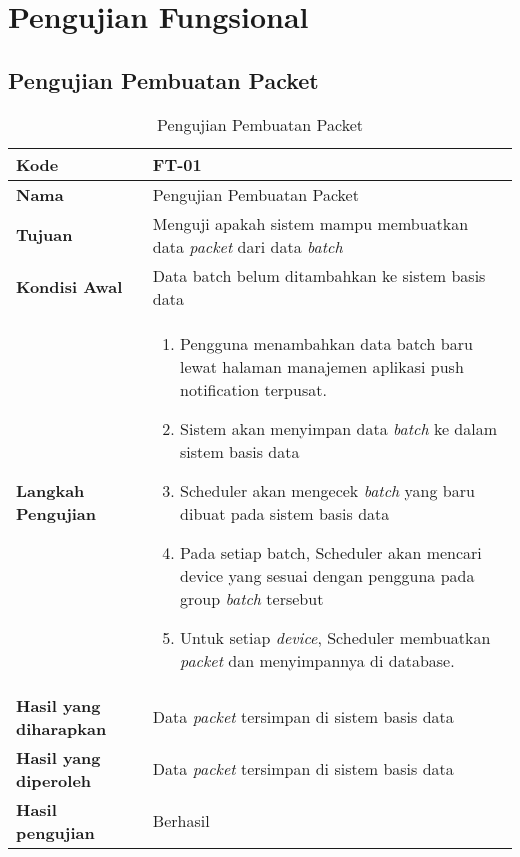 \section{Pengujian Fungsional}

\subsection{Pengujian Pembuatan Packet}

\begin{longtable}{|p{2.5cm}|p{6.5cm}|}
	\caption{Pengujian Pembuatan Packet} \label{t:uji_pembuatan_packet} \\ \hline
	\textbf{Kode} & FT-01 \\ \hline
	\textbf{Nama} & Pengujian Pembuatan Packet \\ \hline
	\textbf{Tujuan} & Menguji apakah sistem mampu membuatkan data \textit{packet} dari data \textit{batch} \\ \hline
	\textbf{Kondisi Awal} & Data batch belum ditambahkan ke sistem basis data \\ \hline
	\textbf{Langkah Pengujian} &  
	\begin{enumerate}
		\item Pengguna menambahkan data batch baru lewat halaman manajemen aplikasi push notification terpusat.
		\item Sistem akan menyimpan data \textit{batch} ke dalam sistem basis data
		\item Scheduler akan mengecek \textit{batch} yang baru dibuat pada sistem basis data
		\item Pada setiap batch, Scheduler akan mencari device yang sesuai dengan pengguna pada group \textit{batch} tersebut
		\item Untuk setiap \textit{device}, Scheduler membuatkan \textit{packet} dan menyimpannya di database.
	\end{enumerate} \\ \hline
	\textbf{Hasil yang diharapkan} & Data \textit{packet} tersimpan di sistem basis data \\ \hline
	\textbf{Hasil yang diperoleh} & Data \textit{packet} tersimpan di sistem basis data \\ \hline
	\textbf{Hasil pengujian} & Berhasil \\ \hline
\end{longtable}


